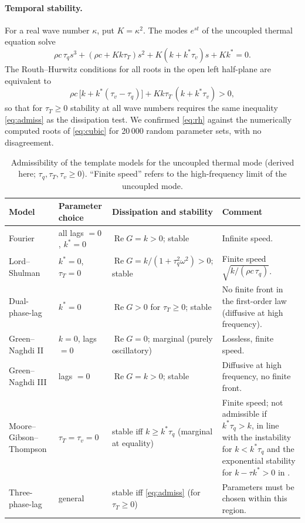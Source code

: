 \paragraph{Temporal stability.} For a real wave number $\kappa$, put $K=\kappa^2$. The modes $e^{st}$ of the uncoupled thermal equation solve
\begin{equation}\label{eq:cubic}
\rho c\,\tau_q s^3+(\rho c+Kk\tau_T)s^2+K(k+k^*\tau_v)s+Kk^*=0 .
\end{equation}
The Routh--Hurwitz conditions for all roots in the open left half-plane are equivalent to
\begin{equation}\label{eq:rh}
\rho c\,\bigl[k+k^*(\tau_v-\tau_q)\bigr]+Kk\tau_T\,(k+k^*\tau_v)>0 ,
\end{equation}
so that for $\tau_T\ge0$ stability at all wave numbers requires the same inequality \eqref{eq:admiss} as the dissipation test. We confirmed \eqref{eq:rh} against the numerically computed roots of \eqref{eq:cubic} for 20\,000 random parameter sets, with no disagreement.

\begin{table}[ht]\centering\small
\caption{Admissibility of the template models for the uncoupled thermal mode (derived here; $\tau_q,\tau_T,\tau_v\ge0$). ``Finite speed'' refers to the high-frequency limit of the uncoupled mode.}\label{tab:admiss}
\begin{tabularx}{\textwidth}{@{}p{2.3cm}p{3.0cm}p{3.6cm}X@{}}\toprule
Model & Parameter choice & Dissipation and stability & Comment\\\midrule
Fourier & all lags $=0$, $k^*=0$ & $\operatorname{Re}G=k>0$; stable & Infinite speed.\\
Lord--Shulman & $k^*=0$, $\tau_T=0$ & $\operatorname{Re}G=k/(1+\tau_q^2\omega^2)>0$; stable & Finite speed $\sqrt{k/(\rho c\,\tau_q)}$.\\
Dual-phase-lag & $k^*=0$ & $\operatorname{Re}G>0$ for $\tau_T\ge0$; stable & No finite front in the first-order law (diffusive at high frequency).\\
Green--Naghdi II & $k=0$, lags $=0$ & $\operatorname{Re}G=0$; marginal (purely oscillatory) & Lossless, finite speed.\\
Green--Naghdi III & lags $=0$ & $\operatorname{Re}G=k>0$; stable & Diffusive at high frequency, no finite front.\\
Moore--Gibson--Thompson & $\tau_T=\tau_v=0$ & stable iff $k\ge k^*\tau_q$ (marginal at equality) & Finite speed; not admissible if $k^*\tau_q>k$, in line with the instability for $k<k^*\tau_q$ and the exponential stability for $k-\tau k^*>0$ in \citet{Quintanilla2019}.\\
Three-phase-lag & general & stable iff \eqref{eq:admiss} (for $\tau_T\ge0$) & Parameters must be chosen within this region.\\
\bottomrule\end{tabularx}
\end{table}


